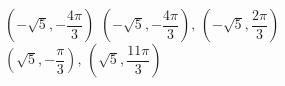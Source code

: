 { $\left( -\sqrt{5}, -\dfrac{4\pi}{3} \right)$}
{$\left( -\sqrt{5}, -\dfrac{4\pi}{3} \right), \, \left( -\sqrt{5}, \dfrac{2\pi}{3} \right)$\\$\left( \sqrt{5}, -\dfrac{\pi}{3} \right), \, \left(\sqrt{5}, \dfrac{11\pi}{3} \right)$\\ }
